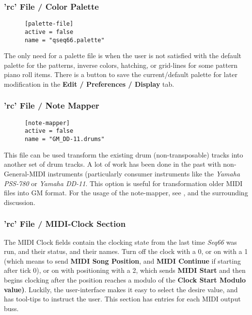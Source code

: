 \subsubsection{'rc' File / Color Palette}
\label{subsubsec:configuration_rc_color_palette}

   \begin{verbatim}
      [palette-file]
      active = false
      name = "qseq66.palette"
   \end{verbatim}

   The only need for a palette file is when the user is not satisfied with the
   default palette for the patterns, inverse colors, hatching,
   or grid-lines for some
   pattern piano roll items.  There is a button to save the current/default
   palette for later modification in the \textbf{Edit / Preferences / Display}
   tab.

\subsubsection{'rc' File / Note Mapper}
\label{subsubsec:configuration_rc_note_mapper}

   \begin{verbatim}
      [note-mapper]
      active = false
      name = "GM_DD-11.drums"
   \end{verbatim}

   This file can be used transform the existing drum (non-transposable) tracks
   into another set of drum tracks.  A lot of work has been done in the past
   with non-General-MIDI instruments (particularly consumer instruments like the
   \textsl{Yamaha PSS-780} or \textsl{Yamaha DD-11}.
   This option is useful for transformation older MIDI files into GM format.
   For the usage of the note-mapper, see
   , and the surrounding
   discussion.

\subsubsection{'rc' File / MIDI-Clock Section}
\label{subsec:configuration_rc_midi_clock}

   The MIDI Clock fields contain the clocking state from the last 
   time \textsl{Seq66} was run, and their status, and their names.
   Turn off the clock with a 0, or on
   with a 1 (which means to send
   \textbf{MIDI Song Position}, and
   \textbf{MIDI Continue} if
   starting after tick 0), or on with positioning with a 2, which sends
   \textbf{MIDI Start}
   and then begins clocking after the position reaches a modulo of the
   \textbf{Clock Start Modulo value)}.  Luckily, the user-interface makes it
   easy to select the desire value, and has tool-tips to instruct the user.
   This section has entries for each MIDI output buss.

